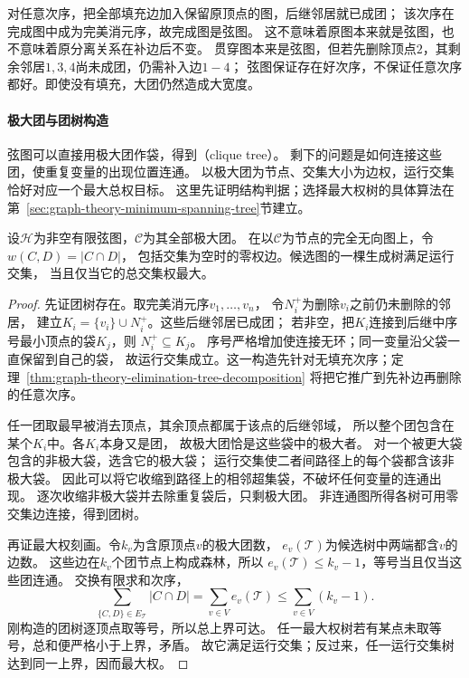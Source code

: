 对任意次序，把全部填充边加入保留原顶点的图，后继邻居就已成团；
该次序在完成图中成为完美消元序，故完成图是弦图。
这不意味着原图本来就是弦图，也不意味着原分离关系在补边后不变。
贯穿图本来是弦图，但若先删除顶点\(2\)，其剩余邻居\(1,3,4\)尚未成团，仍需补入边\(1-4\)；
弦图保证存在好次序，不保证任意次序都好。即使没有填充，大团仍然造成大宽度。

\paragraph{极大团与团树构造}
\label{sec:graph-theory-clique-trees}

弦图可以直接用极大团作袋，得到（clique tree）。
剩下的问题是如何连接这些团，使重复变量的出现位置连通。
以极大团为节点、交集大小为边权，运行交集恰好对应一个最大总权目标。
这里先证明结构判据；选择最大权树的具体算法在
第~\ref{sec:graph-theory-minimum-spanning-tree}节建立。

\begin{theorem}[最大权生成树与团树]
  \label{thm:graph-theory-clique-tree-maximum-weight}
  设\(\mathcal H\)为非空有限弦图，\(\mathcal C\)为其全部极大团。
  在以\(\mathcal C\)为节点的完全无向图上，令\(w(C,D)=|C\cap D|\)，
  包括交集为空时的零权边。候选图的一棵生成树满足运行交集，
  当且仅当它的总交集权最大。
\end{theorem}

\begin{proof}
先证团树存在。取完美消元序\(v_1,\ldots,v_n\)，
令\(N_i^+\)为删除\(v_i\)之前仍未删除的邻居，
建立\(K_i=\{v_i\}\cup N_i^+\)。这些后继邻居已成团；
若非空，把\(K_i\)连接到后继中序号最小顶点的袋\(K_j\)，则
\(N_i^+\subseteq K_j\)。
序号严格增加使连接无环；同一变量沿父袋一直保留到自己的袋，
故运行交集成立。这一构造先针对无填充次序；定理~\ref{thm:graph-theory-elimination-tree-decomposition}
将把它推广到先补边再删除的任意次序。

任一团取最早被消去顶点，其余顶点都属于该点的后继邻域，
所以整个团包含在某个\(K_i\)中。各\(K_i\)本身又是团，
故极大团恰是这些袋中的极大者。
对一个被更大袋包含的非极大袋，选含它的极大袋；
运行交集使二者间路径上的每个袋都含该非极大袋。
因此可以将它收缩到路径上的相邻超集袋，不破坏任何变量的连通出现。
逐次收缩非极大袋并去除重复袋后，只剩极大团。
非连通图所得各树可用零交集边连接，得到团树。

再证最大权刻画。令\(k_v\)为含原顶点\(v\)的极大团数，
\(e_v(\mathcal T)\)为候选树中两端都含\(v\)的边数。
这些边在\(k_v\)个团节点上构成森林，所以
\(e_v(\mathcal T)\leq k_v-1\)，等号当且仅当这些团连通。
交换有限求和次序，
\[
  \sum_{\{C,D\}\in E_{\mathcal T}}|C\cap D|
  =\sum_{v\in V}e_v(\mathcal T)
  \leq\sum_{v\in V}(k_v-1).
\]
刚构造的团树逐顶点取等号，所以总上界可达。
任一最大权树若有某点未取等号，总和便严格小于上界，矛盾。
故它满足运行交集；反过来，任一运行交集树达到同一上界，因而最大权。
\end{proof}

